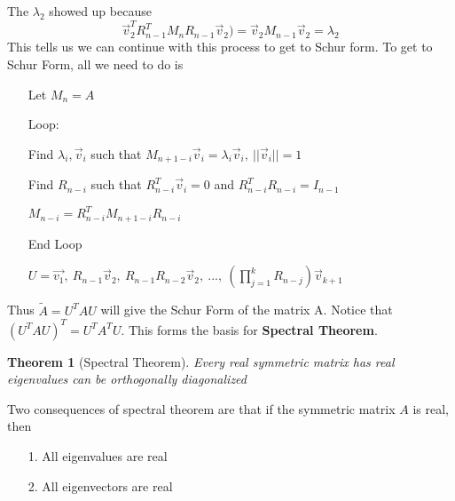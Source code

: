 \documentclass{article}
\newtheorem{theorem}{Theorem}
\begin{document}
The $\lambda_2$ showed up because
$$\vec{v}_2^TR_{n-1}^TM_nR_{n-1}\vec{v}_2)=\vec{v}_2M_{n-1}\vec{v}_2=\lambda_2$$
This tells us we can continue with this process to get to Schur form.
To get to Schur Form, all we need to do is
\begin{itemize}
    \item[] Let $M_n=A$
    \item[Loop:]
    \item[] Find $\lambda_i, \vec{v}_i$ such that $M_{n+1-i}\vec{v}_i=\lambda_i\vec{v}_i,\ ||\vec{v}_i||=1$
    \item[] Find $R_{n-i}$ such that $R_{n-i}^T\vec{v}_i=0$ and $R_{n-i}^TR_{n-i}=I_{n-1}$
    \item[] $M_{n-i} = R_{n-i}^TM_{n+1-i}R_{n-i}$
    \item[End Loop]
    \item[] $U = \vec{v_1},\ R_{n-1}\vec{v}_2,\ R_{n-1}R_{n-2}\vec{v}_2,\ ...,\ (\prod_{j=1}^{k}{R_{n-j}})\vec{v}_{k+1}$
\end{itemize}
Thus $\tilde{A}=U^TAU$ will give the Schur Form of the matrix A.
Notice that $(U^TAU)^T=U^TA^TU$. This forms the basis for \textbf{Spectral Theorem}.
\begin{theorem}[Spectral Theorem]
    Every real symmetric matrix has real eigenvalues can be orthogonally diagonalized
\end{theorem}
Two consequences of spectral theorem are that if the symmetric matrix $A$ is real, then
\begin{itemize}
    \item[1. ] All eigenvalues are real
    \item[2. ] All eigenvectors are real
\end{itemize}
\end{document}
